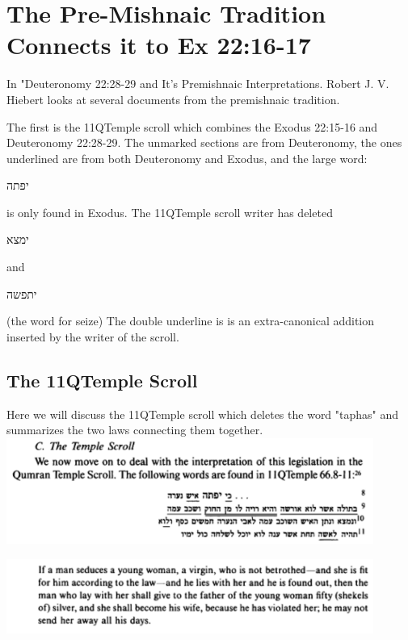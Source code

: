 \documentclass[11pt]{article}
\begin{document}
\section{The Pre-Mishnaic Tradition Connects it to Ex 22:16-17}
In "Deuteronomy 22:28-29 and It's Premishnaic Interpretations. Robert J. V. Hiebert looks at several documents from the premishnaic tradition. 



The first is the 11QTemple scroll which combines the Exodus 22:15-16 and Deuteronomy 22:28-29. The unmarked sections are from Deuteronomy, the ones underlined are from both Deuteronomy and Exodus, and the large word: \begin{hebrew}יפתה\end{hebrew} is only found in Exodus. The 11QTemple scroll writer has deleted \begin{hebrew}ימצא\end{hebrew} and \begin{hebrew}יתפשה\end{hebrew} (the word for seize) The double underline is is an extra-canonical addition inserted by the writer of the scroll. 


\subsection{The 11QTemple Scroll}
Here we will discuss the 11QTemple scroll which deletes the word "taphas" and summarizes the two laws connecting them together. \newline
\includegraphics[width=12cm]{temple_scroll1}

\includegraphics[width=12cm]{dead_sea_scrolls}
\end{document}
